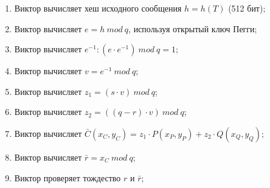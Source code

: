 
\begin{enumerate}

\item Виктор вычисляет хеш исходного сообщения $h = h(T)$ (512 бит);
\item Виктор вычисляет $e = h \ mod \ q$, используя открытый ключ Пегги;
\item Виктор вычисляет $e^{-1}: (e \cdot e^{-1}) \ mod \ q = 1$;
\item Виктор вычисляет $v = e^{-1} \ mod \ q$;
\item Виктор вычисляет $z_1 = (s \cdot v) \ mod \ q$;
\item Виктор вычисляет $z_2 = ((q - r) \cdot v) \ mod \ q$;
\item Виктор вычисляет $\bar{C}(x_C, y_C) = z_1 \cdot P(x_P, y_P) +  z_2 \cdot Q(x_Q, y_Q)$;
\item Виктор вычисляет $\bar{r} = x_C \ mod \ q$;
\item Виктор проверяет тождество $r$ и $\bar{r}$;

\end{enumerate}